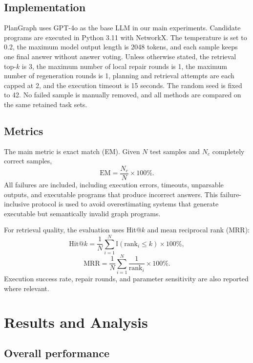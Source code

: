 \documentclass[pdflatex,sn-mathphys-num]{sn-jnl}
\theoremstyle{thmstyleone}
\theoremstyle{thmstyletwo}
\theoremstyle{thmstylethree}
\begin{document}
\subsection{Implementation}

PlanGraph uses GPT-4o as the base LLM in our main experiments. Candidate programs are executed in Python 3.11 with NetworkX. The temperature is set to 0.2, the maximum model output length is 2048 tokens, and each sample keeps one final answer without answer voting. Unless otherwise stated, the retrieval top-$k$ is 3, the maximum number of local repair rounds is 1, the maximum number of regeneration rounds is 1, planning and retrieval attempts are each capped at 2, and the execution timeout is 15 seconds. The random seed is fixed to 42. No failed sample is manually removed, and all methods are compared on the same retained task sets.

\subsection{Metrics}

The main metric is exact match (EM). Given $N$ test samples and $N_c$ completely correct samples,
\begin{equation}
\mathrm{EM}=\frac{N_c}{N}\times 100\%.
\end{equation}
All failures are included, including execution errors, timeouts, unparsable outputs, and executable programs that produce incorrect answers. This failure-inclusive protocol is used to avoid overestimating systems that generate executable but semantically invalid graph programs.

For retrieval quality, the evaluation uses Hit@$k$ and mean reciprocal rank (MRR):
\begin{equation}
\mathrm{Hit@}k=\frac{1}{N}\sum_{i=1}^{N}\mathbb{I}(\mathrm{rank}_i \leq k)\times 100\%,
\end{equation}
\begin{equation}
\mathrm{MRR}=\frac{1}{N}\sum_{i=1}^{N}\frac{1}{\mathrm{rank}_i}\times 100\%.
\end{equation}
Execution success rate, repair rounds, and parameter sensitivity are also reported where relevant.

\section{Results and Analysis}\label{sec:results}

\subsection{Overall performance}
\end{document}
